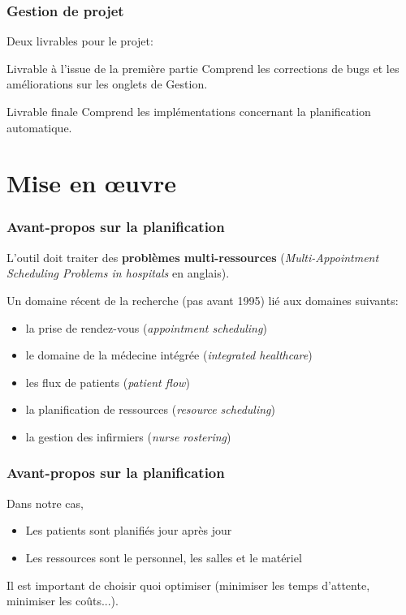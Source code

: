\documentclass{beamer}
\begin{document}
\begin{frame}
\frametitle{Gestion de projet}

Deux livrables pour le projet:

\bigbreak

\begin{block}{Livrable à l'issue de la première partie}
	Comprend les corrections de bugs et les améliorations sur les onglets de Gestion.
\end{block}

\begin{block}{Livrable finale}
	Comprend les implémentations concernant la planification automatique.
\end{block}

\end{frame}


\section{Mise en œuvre}

\begin{frame}
\frametitle{Avant-propos sur la planification}

L'outil doit traiter des \textbf{problèmes multi-ressources} (\textit{Multi-Appointment Scheduling Problems in hospitals} en anglais).

\bigbreak

Un domaine récent de la recherche (pas avant 1995) lié aux domaines suivants: 

\begin{itemize}
	\item la prise de rendez-vous (\textit{appointment scheduling}) 
	\item le domaine de la médecine intégrée (\textit{integrated healthcare}) 
	\item les flux de patients (\textit{patient flow}) 
	\item la planification de ressources (\textit{resource scheduling}) 
	\item la gestion des infirmiers (\textit{nurse rostering})
\end{itemize}

\end{frame}

\begin{frame}
\frametitle{Avant-propos sur la planification}

Dans notre cas, 

\begin{itemize}
	\item Les patients sont planifiés jour après jour
	\item Les ressources sont le personnel, les salles et le matériel
\end{itemize}

Il est important de choisir quoi optimiser (minimiser les temps d'attente, minimiser les coûts...).

\end{frame}
\end{document}

